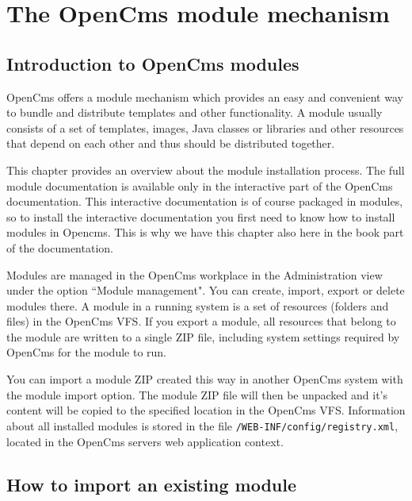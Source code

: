\chapter{The OpenCms module mechanism}
\label{The OpenCms module mechanism} 


\section{Introduction to OpenCms modules}
OpenCms offers a module mechanism which provides an easy and convenient way to bundle and distribute templates 
and other functionality. A module usually consists of a set of templates, images, Java classes or libraries 
and other resources that depend on each other and thus should be distributed together.

This chapter provides an overview about the module installation process.
The full module documentation is available only in the interactive part of the OpenCms documentation.
This interactive documentation is of course packaged in modules, so to install the interactive 
documentation you first need to know how to install modules in Opencms.
This is why we have this chapter also here in the book part of the documentation.

Modules are managed in the OpenCms workplace in the Administration view under the option ``Module management". 
You can create, import, export or delete modules there. 
A module in a running system is a set of resources (folders and files) in the OpenCms VFS. 
If you export a module, all resources that belong to the module are written to a single ZIP file, 
including system settings required by OpenCms for the module to run.

You can import a module ZIP created this way in another OpenCms system with the module import option. 
The module ZIP file will then be unpacked and it's content will be copied to the specified location in the OpenCms VFS. 
Information about all installed modules is stored in the file \texttt{/WEB-INF/config/registry.xml}, 
located in the OpenCms servers web application context.

\section{How to import an existing module}

